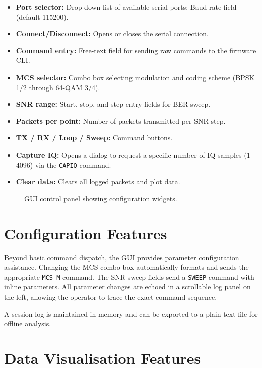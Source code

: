 \documentclass[12pt, a4paper, oneside]{report}
\begin{document}
\begin{itemize}[noitemsep]
  \item \textbf{Port selector:} Drop-down list of available serial ports; Baud rate field (default 115200).
  \item \textbf{Connect/Disconnect:} Opens or closes the serial connection.
  \item \textbf{Command entry:} Free-text field for sending raw commands to the firmware CLI.
  \item \textbf{MCS selector:} Combo box selecting modulation and coding scheme (BPSK 1/2 through 64-QAM 3/4).
  \item \textbf{SNR range:} Start, stop, and step entry fields for BER sweep.
  \item \textbf{Packets per point:} Number of packets transmitted per SNR step.
  \item \textbf{TX / RX / Loop / Sweep:} Command buttons.
  \item \textbf{Capture IQ:} Opens a dialog to request a specific number of IQ samples (1–4096) via the \texttt{CAPIQ} command.
  \item \textbf{Clear data:} Clears all logged packets and plot data.
\end{itemize}

\begin{figure}[H]
  \centering
  \caption{GUI control panel showing configuration widgets.}
  \label{fig:gui_controls}
\end{figure}

\section{Configuration Features}

Beyond basic command dispatch, the GUI provides parameter configuration assistance. Changing the MCS combo box automatically formats and sends the appropriate \texttt{MCS M} command. The SNR sweep fields send a \texttt{SWEEP} command with inline parameters. All parameter changes are echoed in a scrollable log panel on the left, allowing the operator to trace the exact command sequence.

A session log is maintained in memory and can be exported to a plain-text file for offline analysis.

\section{Data Visualisation Features}
\end{document}
